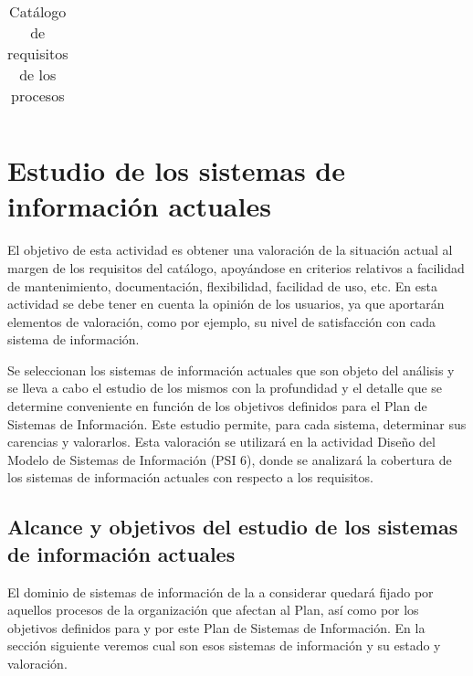 \documentclass[11pt,a4paper,spanish,twoside]{book}
\begin{document}
\begin{table}[!h]
\begin{tabular}{clc}
  \end{tabular}
\caption{Catálogo de requisitos de los procesos}
\end{table}


\chapter{Estudio de los sistemas de información actuales}
El objetivo de esta actividad es obtener una valoración de la situación
actual al margen de los requisitos del catálogo, apoyándose en criterios
relativos a facilidad de mantenimiento, documentación, flexibilidad,
facilidad de uso, etc. En esta actividad se debe tener en cuenta la opinión
de los usuarios, ya que aportarán elementos de valoración, como por ejemplo,
su nivel de satisfacción con cada sistema de información. 

Se seleccionan los
sistemas de información actuales que son objeto del análisis y se lleva a
cabo el estudio de los mismos con la profundidad y el detalle que se
determine conveniente en función de los objetivos definidos para el Plan de
Sistemas de Información. Este estudio permite, para cada sistema, determinar
sus carencias y valorarlos. Esta valoración se utilizará en la actividad
Diseño del Modelo de Sistemas de Información (PSI 6), donde se analizará la
cobertura de los sistemas de información actuales con respecto a los
requisitos.

\section{Alcance y objetivos del estudio de los sistemas de 
  información actuales} 
El dominio de sistemas de información de la a considerar quedará fijado por
aquellos procesos de la organización que afectan al Plan, así como por los 
objetivos definidos para y por este Plan de Sistemas de Información. En la 
sección siguiente veremos cual son esos sistemas de información y su estado y 
valoración.
\end{document}
